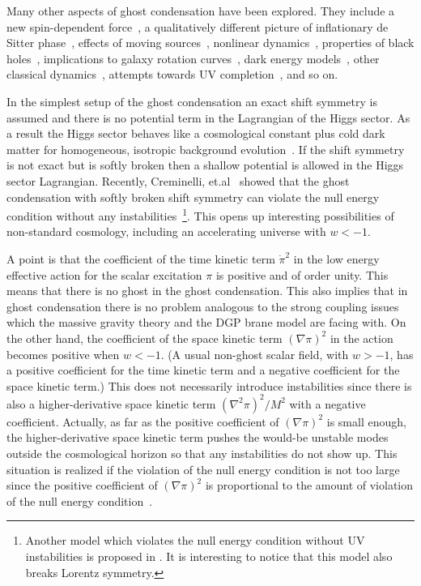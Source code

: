 Many other aspects of ghost condensation have been explored. They
include a new spin-dependent force~\cite{Arkani-Hamed:2004ar},  
a qualitatively different picture of inflationary de Sitter
phase~\cite{Arkani-Hamed:2003uz,Senatore:2004rj}, 
effects of moving sources~\cite{Dubovsky:2004qe,Peloso:2004ut}, 
nonlinear dynamics~\cite{Krotov:2004if,Arkani-Hamed:2005gu}, 
properties of black holes~\cite{Frolov:2004vm,Mukohyama:2005rw,Dubovsky:2006vk},
implications to galaxy rotation curves~\cite{Kiselev:2004bh,Kiselev:2005sv,Kiselev:2006gc},
dark energy models~\cite{Piazza:2004df,Krause:2004bu,deRham:2006pe},
other classical dynamics~\cite{Anisimov:2004sp,Mann:2005jz}, 
attempts towards UV
completion~\cite{Graesser:2005ar,O'Connell:2006de},
and so on. 



In the simplest setup of the ghost condensation an exact shift symmetry
is assumed and there is no potential term in the Lagrangian of the Higgs
sector. As a result the Higgs sector behaves like a cosmological
constant plus cold dark matter for homogeneous, isotropic background 
evolution~\cite{Arkani-Hamed:2005gu}. If the shift symmetry is not exact
but is softly broken then a shallow potential is allowed in the Higgs
sector Lagrangian. Recently, Creminelli, et.al~\cite{Creminelli:2006xe}
showed that the ghost condensation with softly broken shift symmetry can
violate the null energy condition without any instabilities~\footnote{
Another model which violates the null energy condition without UV 
instabilities is proposed in \cite{Rubakov:2006pn}. It is interesting to
notice that this model also breaks Lorentz symmetry. 
}. This opens up interesting possibilities of non-standard cosmology,
including an accelerating universe with $w<-1$. 


A point is that the coefficient of the time kinetic term $\dot{\pi}^2$ 
in the low energy effective action for the scalar excitation $\pi$ is
positive and of order unity. This means that there is no ghost in the
ghost condensation. This also implies that in ghost condensation there
is no problem analogous to the strong coupling issues which the massive
gravity theory and the DGP brane model are facing with. On the other
hand, the coefficient of the space kinetic term $(\nabla\pi)^2$ in the
action becomes positive when $w<-1$. (A usual non-ghost scalar field,
with $w>-1$, has a positive coefficient for the time kinetic term and a 
negative coefficient for the space kinetic term.) This does not
necessarily introduce instabilities since there is also a
higher-derivative space kinetic term $(\nabla^2\pi)^2/M^2$ with a
negative coefficient. Actually, as far as the positive coefficient of
$(\nabla\pi)^2$ is small enough, the higher-derivative space kinetic
term pushes the would-be unstable modes outside the cosmological horizon
so that any instabilities do not show up. This situation is realized if 
the violation of the null energy condition is not too large since the
positive coefficient of $(\nabla\pi)^2$ is proportional to the amount of
violation of the null energy condition~\cite{Creminelli:2006xe}. 


